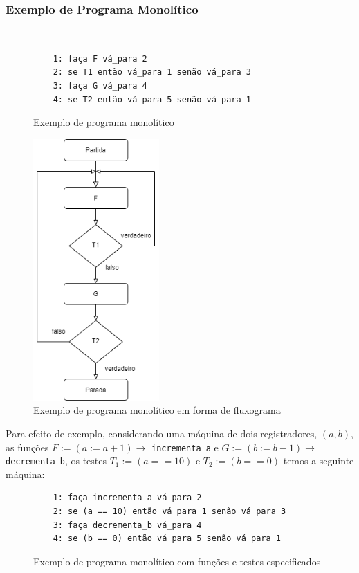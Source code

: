 \documentclass[12pt,fleqn]{article}
\begin{document}
\subsubsection{Exemplo de Programa Monolítico}
~
\begin{figure}[H]
\begin{verbatim}
    1: faça F vá_para 2
    2: se T1 então vá_para 1 senão vá_para 3
    3: faça G vá_para 4
    4: se T2 então vá_para 5 senão vá_para 1
\end{verbatim}
\caption{Exemplo de programa monolítico}
\end{figure}

\begin{figure}[H]
    \centering
    \includegraphics[height=10cm]{img/monolitico_ex}
    \caption{Exemplo de programa monolítico em forma de fluxograma}
\end{figure}

Para efeito de exemplo, considerando uma máquina de dois registradores, $(a,b)$,
as funções $F := (a := a+1) \rightarrow$ \verb|incrementa_a| e $G := (b := b-1)
\rightarrow$ \verb|decrementa_b|, os testes $T_1 := (a == 10)$ e $T_2 := (b ==
0)$ temos a seguinte máquina:

\begin{figure}[H]
\begin{verbatim}
    1: faça incrementa_a vá_para 2
    2: se (a == 10) então vá_para 1 senão vá_para 3
    3: faça decrementa_b vá_para 4
    4: se (b == 0) então vá_para 5 senão vá_para 1
\end{verbatim}
\caption{Exemplo de programa monolítico com funções e testes especificados}
\end{figure}
\end{document}
